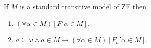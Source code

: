If $M$ is a standard transitive model of ZF then
\begin{enumerate}
\item $(\forall \alpha \in M)[F' \alpha \in M]$,
\item $a \subseteq \omega \land a \in M \rightarrow (\forall \alpha \in M)[F_a' \alpha \in M]$.
\end{enumerate}
